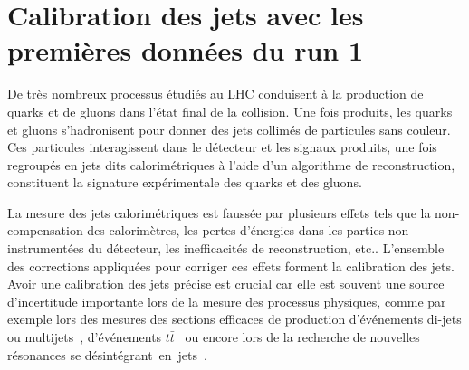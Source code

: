 \chapter{Calibration des jets avec les premi\`eres donn\'ees du run 1}
\label{chap:calibjets}

De tr\`es nombreux processus \'etudi\'es au LHC conduisent \`a la production de quarks et de gluons dans l'\'etat final de la collision. 
Une fois produits, les quarks et gluons s'hadronisent pour donner des jets collim\'es de particules sans couleur. 
Ces particules interagissent dans le d\'etecteur et les signaux produits, une fois regroup\'es en jets dits calorim\'etriques \`a l'aide d'un algorithme de reconstruction, constituent la signature exp\'erimentale des quarks et des gluons. 

La mesure des jets calorim\'etriques est fauss\'ee par plusieurs effets tels que la non-compensation des calorim\`etres, les pertes d'\'energies dans les parties non-instrument\'ees du d\'etecteur, les inefficacit\'es de reconstruction, etc.. 
L'ensemble des corrections appliqu\'ees pour corriger ces effets forment la calibration des jets. 
Avoir une calibration des jets pr\'ecise est crucial car elle est souvent une source d'incertitude importante lors de la mesure des processus physiques, comme 
par exemple lors des mesures des sections efficaces de production d'\'ev\'enements di-jets ou multijets~\cite{Aad:2014vwa,Aad:2013tea}, d'\'ev\'enements $t\bar{t}$~\cite{Aad:2014iaa} ou encore lors de la recherche de nouvelles r\'esonances se d\'esint\'egrant~en~jets~\cite{Aad:2014aqa}. 


